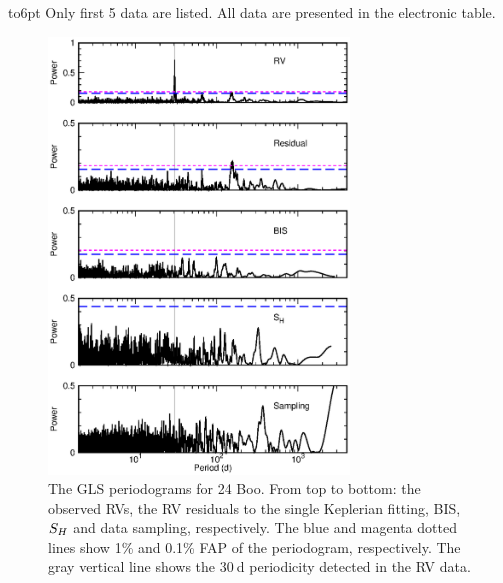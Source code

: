 \documentclass[]{pasj01}
\begin{document}

\begin{table}
 \begin{tabnote}
\noindent
\hbox to6pt{\footnotemark[$*$]\hss}\unskip%
Only first 5 data are listed. All data are presented in the electronic table. 
\end{tabnote}
\label{rvtab_127}
\end{table}

\begin{figure}
\begin{center}
\includegraphics[width=8cm]{peri_127243.eps}
\end{center}
\caption{The GLS periodograms for 24 Boo. From top to bottom: the observed RVs, the RV residuals to the single Keplerian fitting, BIS, $S_{\rm{H}}$ and data sampling, respectively. The blue and magenta dotted lines show 1\% and 0.1\% FAP of the periodogram, respectively. The gray vertical line shows the $30\>$d periodicity detected in the RV data.}
\label{peri_127243}
\end{figure}
\end{document}
